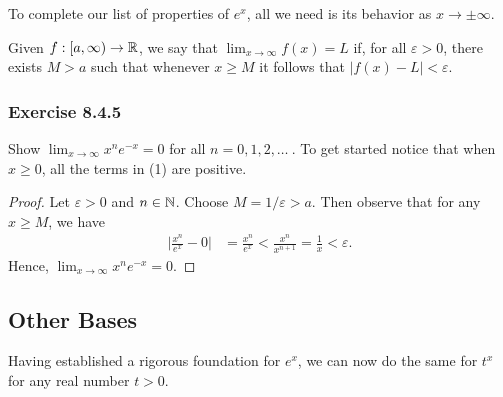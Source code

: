 To complete our list of properties of \( e^{x}  \), all we need is its behavior as \( x \to \pm \infty  \).

\begin{definition}{}{}
    Given \( f : [a,\infty )  \to \mathbb{R} \), we say that \( \lim_{ x \to \infty  }  f(x) = L  \) if, for all \( \varepsilon > 0  \), there exists \( M > a  \) such that whenever \( x \geq M  \) it follows that \( |  f(x) - L  | < \varepsilon  \).
\end{definition}

\subsubsection{Exercise 8.4.5} Show \( \lim_{ x \to \infty  }  x^{n} e^{-x} = 0  \) for all \( n = 0,1,2, \dots \ \). To get started notice that when \( x \geq 0   \), all the terms in (1) are positive.
\begin{proof}
    Let \( \varepsilon > 0  \) and \( n \in \mathbb{N}  \). Choose \( M = 1 / \varepsilon  > a   \). Then observe that for any \( x \geq M  \), we have
    \begin{align*}
        \Big| \frac{ x^{n} }{  e^{x} }  - 0  \Big| &= \frac{ x^{n}  }{  e^{x} }  
                                                   <  \frac{ x^{n}  }{  x^{n+1} } 
                                                   = \frac{ 1 }{ x } 
                                                   < \varepsilon.
    \end{align*}
    Hence, \( \lim_{ x \to \infty  }  x^{n} e^{-x} = 0. \)
\end{proof}

\subsection{Other Bases}

Having established a rigorous foundation for \( e^{x}  \), we can now do the same for \( t^{x}  \) for any real number \( t > 0   \). 

